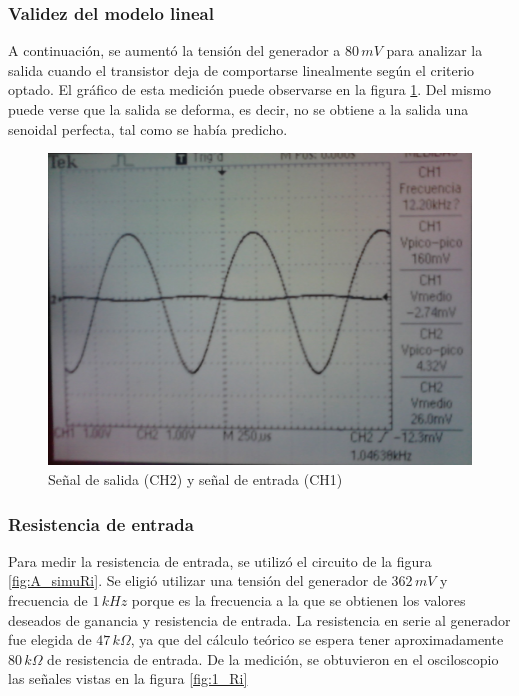 \documentclass[10pt,spanish,a4paper,notitlepage]{article}
\begin{document}
\subsubsection{Validez del modelo lineal}
A continuación, se aumentó la tensión del generador a $80\,\unit{mV}$ para analizar la salida cuando el transistor deja de comportarse linealmente según el criterio optado. El gráfico de esta medición puede observarse en la figura \ref{fig:1_Av_def}. Del mismo puede verse que la salida se deforma, es decir, no se obtiene a la salida una senoidal perfecta, tal como se había predicho.


\begin{figure}[H]
\centering
\includegraphics[scale=0.19]{mediciones/1_Avdef.jpg}
\caption{Señal de salida (CH2) y señal de entrada (CH1)}
\label{fig:1_Av_def}
\end{figure}

\subsubsection{Resistencia de entrada}
Para medir la resistencia de entrada, se utilizó el circuito de la figura \ref{fig:A_simuRi}. Se eligió utilizar una tensión del generador de $362\,\unit{mV}$ y frecuencia de $1\,\unit{kHz}$ porque es la frecuencia a la que se obtienen los valores deseados de ganancia y resistencia de entrada. La resistencia en serie al generador fue elegida de $47\,\unit{k\Omega}$, ya que del cálculo teórico se espera tener aproximadamente $80\,\unit{k\Omega}$ de resistencia de entrada. De la medición, se obtuvieron en el osciloscopio las señales vistas en la figura \ref{fig:1_Ri}
\end{document}
